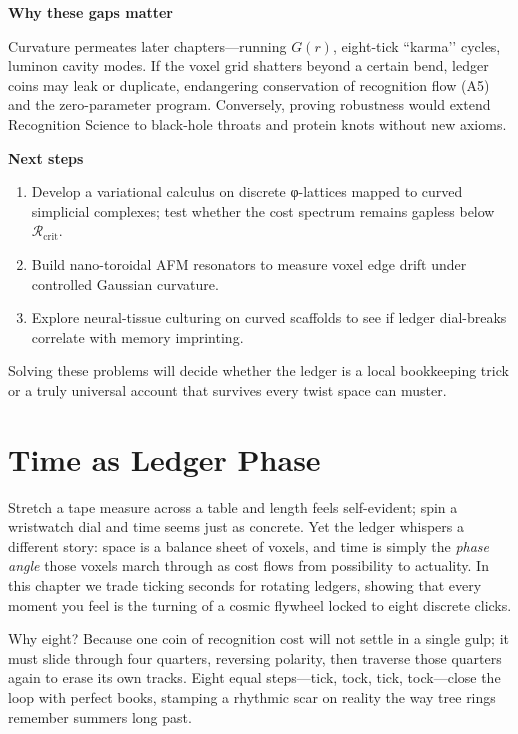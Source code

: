 \documentclass[11pt,oneside]{book}
\begin{document}
\bigskip
\noindent\textbf{Why these gaps matter}

Curvature permeates later chapters—running $G(r)$, eight-tick “karma’’ cycles, luminon cavity modes.  
If the voxel grid shatters beyond a certain bend, ledger coins may leak or duplicate, endangering conservation of recognition flow (A5) and the zero-parameter program.  
Conversely, proving robustness would extend Recognition Science to black-hole throats and protein knots without new axioms.

\bigskip
\noindent\textbf{Next steps}

\begin{enumerate}
\item Develop a variational calculus on discrete φ-lattices mapped to curved simplicial complexes; test whether the cost spectrum remains gapless below $\mathcal R_{\text{crit}}$.
\item Build nano-toroidal AFM resonators to measure voxel edge drift under controlled Gaussian curvature.
\item Explore neural-tissue culturing on curved scaffolds to see if ledger dial-breaks correlate with memory imprinting.
\end{enumerate}

Solving these problems will decide whether the ledger is a local bookkeeping trick or a truly universal account that survives every twist space can muster.

\chapter{Time as Ledger Phase}
\label{chap:time-ledger-phase}

Stretch a tape measure across a table and length feels self-evident; spin a wristwatch dial and time seems just as concrete.  
Yet the ledger whispers a different story: space is a balance sheet of voxels, and time is simply the \emph{phase angle} those voxels march through as cost flows from possibility to actuality.  
In this chapter we trade ticking seconds for rotating ledgers, showing that every moment you feel is the turning of a cosmic flywheel locked to eight discrete clicks.

Why eight?  
Because one coin of recognition cost will not settle in a single gulp; it must slide through four quarters, reversing polarity, then traverse those quarters again to erase its own tracks.  
Eight equal steps—tick, tock, tick, tock—close the loop with perfect books, stamping a rhythmic scar on reality the way tree rings remember summers long past.
\end{document}
